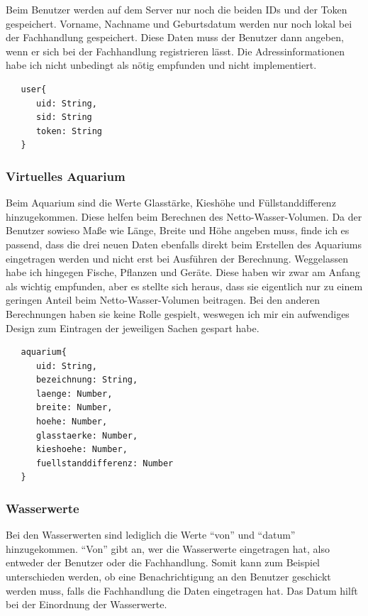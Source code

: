 Beim Benutzer werden auf dem Server nur noch die beiden IDs und der Token gespeichert. Vorname, Nachname und Geburtsdatum werden nur noch lokal bei der Fachhandlung gespeichert. Diese Daten muss der Benutzer dann angeben, wenn er sich bei der Fachhandlung registrieren lässt. Die Adressinformationen habe ich nicht unbedingt als nötig empfunden und nicht implementiert.

\begin{lstlisting}
   user{
      uid: String,
      sid: String
      token: String
   }
\end{lstlisting}

\subsubsection{Virtuelles Aquarium}

Beim Aquarium sind die Werte Glasstärke, Kieshöhe und Füllstanddifferenz hinzugekommen. Diese helfen beim Berechnen des Netto-Wasser-Volumen. Da der Benutzer sowieso Maße wie Länge, Breite und Höhe angeben muss, finde ich es passend, dass die drei neuen Daten ebenfalls direkt beim Erstellen des Aquariums eingetragen werden und nicht erst bei Ausführen der Berechnung. Weggelassen habe ich hingegen Fische, Pflanzen und Geräte. Diese haben wir zwar am Anfang als wichtig empfunden, aber es stellte sich heraus, dass sie eigentlich nur zu einem geringen Anteil beim Netto-Wasser-Volumen beitragen. Bei den anderen Berechnungen haben sie keine Rolle gespielt, weswegen ich mir ein aufwendiges Design zum Eintragen der jeweiligen Sachen gespart habe.

\begin{lstlisting}
   aquarium{
      uid: String,
      bezeichnung: String,
      laenge: Number,
      breite: Number,
      hoehe: Number,
      glasstaerke: Number,
      kieshoehe: Number,
      fuellstanddifferenz: Number
   }
\end{lstlisting}

\subsubsection{Wasserwerte}

Bei den Wasserwerten sind lediglich die Werte ``von'' und ``datum'' hinzugekommen. ``Von'' gibt an, wer die Wasserwerte eingetragen hat, also entweder der Benutzer oder die Fachhandlung. Somit kann zum Beispiel unterschieden werden, ob eine Benachrichtigung an den Benutzer geschickt werden muss, falls die Fachhandlung die Daten eingetragen hat. Das Datum hilft bei der Einordnung der Wasserwerte.

